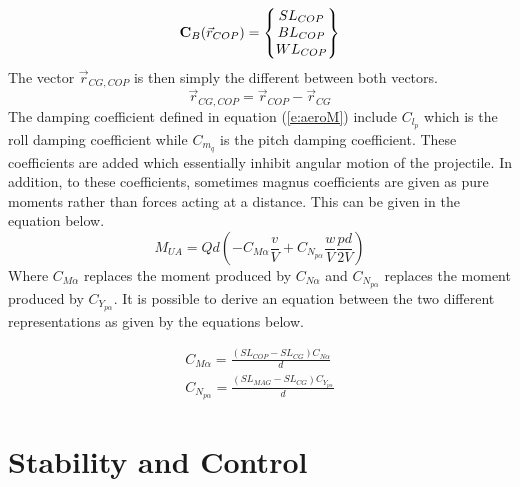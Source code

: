 \documentclass{article}
\begin{document}
\begin{equation}
{\bf C}_B(\vec{r}_{COP}) = \begin{Bmatrix} SL_{COP} \\ BL_{COP} \\ WL_{COP} \end{Bmatrix}
\end{equation}
The vector $\vec{r}_{CG,COP}$ is then simply the different between
both vectors.
\begin{equation}
\vec{r}_{CG,COP} = \vec{r}_{COP}-\vec{r}_{CG}
\end{equation}
The damping coefficient defined in equation (\ref{e:aeroM})
include $C_{l_p}$ which is the roll damping coefficient while $C_{m_q}$ is the pitch damping
coefficient. These coefficients are added which essentially inhibit
angular motion of the projectile. In addition, to these coefficients,
sometimes magnus coefficients are given as pure moments rather 
than forces acting at a distance. This can be given in the equation
below. 
\begin{equation}
M_{UA} = Qd (-C_{M\alpha}\frac{v}{V} + C_{N_{p\alpha}}\frac{w}{V}\frac{pd}{2V})
\end{equation}
Where $C_{M\alpha}$ replaces the moment produced by $C_{N\alpha}$ and
$C_{N_{p\alpha}}$ replaces the moment produced by
$C_{Y_{p\alpha}}$. It is possible to derive an equation between the
two different representations as given by the equations below.

\begin{equation}
\begin{matrix}
C_{M\alpha} = \frac{(SL_{COP}-SL_{CG})C_{N\alpha}}{d} \\
C_{N_{p\alpha}} = \frac{(SL_{MAG}-SL_{CG})C_{Y_{p\alpha}}}{d}
\end{matrix}
\end{equation}

\section{Stability and Control}
\end{document}
